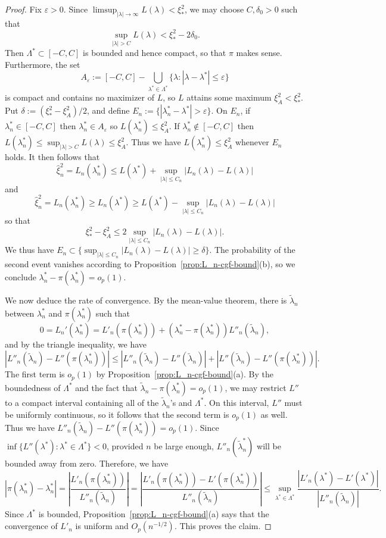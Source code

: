 \documentclass{article}
\theoremstyle{definition}
\newcommand*\eps{\epsilon}
\renewcommand*\epsilon{\varepsilon}
\newcommand{\1}{\mathbbm{1}}
\begin{document}
\begin{proof}
    Fix $\eps > 0$. Since $\limsup_{|\lambda| \to \infty} L(\lambda) < \xi_*^2$, we may choose $C, \delta_0 > 0$ such that 
    \[
    \sup_{|\lambda| > C} L(\lambda) < \xi_*^2 - 2\delta_0.
    \]
    Then $\Lambda^* \subset [-C, C]$ is bounded and hence compact, so that  $\pi$ makes sense. Furthermore, 
    the set \[
    A_\eps := [-C, C] - \bigcup_{\lambda^* \in \Lambda^*} \{\lambda: |\lambda-\lambda^*| \leq \eps\}
    \]
    is compact and contains no maximizer of $L$, so $L$ attains some maximum $\xi_A^2 < \xi_*^2$. Put $\delta := (\xi_*^2 - \xi_A^2)/2$, and define $E_n := \{|\lambda^*_n - \lambda^*| > \eps\}$. On $E_n$, if $\lambda^*_n \in [-C, C]$ then $\lambda^*_n \in A_\eps$ so $L(\lambda^*_n) \leq \xi_A^2$. If $\lambda^*_n \not\in [-C, C]$ then $L(\lambda^*_n) \leq \sup_{|\lambda| > C} L(\lambda) \leq \xi_A^2$. Thus we have $L(\lambda^*_n) \leq \xi_A^2$ whenever $E_n$ holds. It then follows that 
    \[
    \hat \xi_n^2 = L_n(\lambda^*_n) \leq L(\lambda^*) + \sup_{|\lambda| \leq C_n} |L_n(\lambda) - L(\lambda)|
    \]
    and 
    \[
    \hat \xi_n^2 = L_n(\lambda^*_n) \geq L_n(\lambda^*) \geq L(\lambda^*) - \sup_{|\lambda| \leq C_n} |L_n(\lambda) - L(\lambda)| 
    \]
    so that 
    \[
    \xi_*^2 - \xi_A^2 \leq 2\sup_{|\lambda| \leq C_n} |L_n(\lambda) - L(\lambda)|.
    \]
We thus have $E_n \subset \{\sup_{|\lambda| \leq C_n} |L_n(\lambda) - L(\lambda)| \geq \delta\}$. The probability of the second event vanishes according to Proposition~\ref{prop:L_n-cgf-bound}(b), so we conclude $\lambda^*_n - \pi(\lambda^*_n) = o_p(1)$.

    We now deduce the rate of convergence.
    By the mean-value theorem, there is $\tilde \lambda_n$ between $\lambda^*_n$ and $\pi(\lambda^*_n)$ such that 
    \[
    0 = L_n'(\lambda^*_n) = L'_n(\pi(\lambda^*_n)) + (\lambda^*_n - \pi(\lambda^*_n))L''_n(\tilde \lambda_n),
    \]
    and by the triangle inequality, we have 
    \[
    |L''_n(\tilde \lambda_n) - L''(\pi(\lambda^*_n))| \leq |L''_n(\tilde \lambda_n) - L''(\tilde \lambda_n)| + |L''(\tilde \lambda_n) - L''(\pi(\lambda^*_n))|. 
    \]
    The first term is $o_p(1)$ by Proposition~\ref{prop:L_n-cgf-bound}(a). By the boundedness of $\Lambda^*$ and the fact that $\tilde \lambda_n - \pi(\lambda^*_n) = o_p(1)$, we may restrict $L''$ to a compact interval containing all of the $\tilde \lambda_n$'s and $\Lambda^*$. On this interval, $L''$ must be uniformly continuous, so it follows that the second term is $o_p(1)$ as well. Thus we have $L''_n(\tilde \lambda_n) - L''(\pi(\lambda^*_n)) = o_p(1)$. Since $\inf \{L''(\lambda^*): \lambda^* \in \Lambda^*\} < 0$,  provided $n$ be large enough, $L''_n(\tilde \lambda^*_n)$ will be bounded away from zero. Therefore, we have 
    \[
    |\pi(\lambda^*_n)-\lambda^*_n|  = \left|\frac{L'_n(\pi(\lambda^*_n))}{L''_n(\tilde \lambda_n)}\right| = \left|\frac{L'_n(\pi(\lambda^*_n)) - L'(\pi(\lambda^*_n))}{L''_n(\tilde \lambda_n)}\right|  \leq \sup_{\lambda^* \in \Lambda^*} \frac{|L'_n(\lambda^*) - L'(\lambda^*)|}{|L''_n(\tilde \lambda_n)|}.
    \]
    Since $\Lambda^*$ is bounded, Proposition~\ref{prop:L_n-cgf-bound}(a) says that the convergence of $L'_n$ is uniform and $O_p(n^{-1/2})$. This proves the claim.  
\end{proof}
\end{document}
